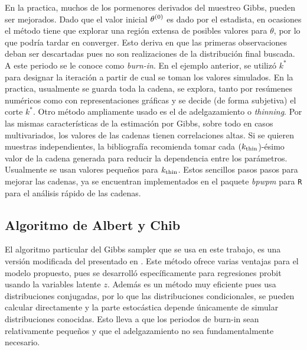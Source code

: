 \documentclass[../Main/Main.tex]{subfiles}
\begin{document}
En la practica, muchos de los pormenores derivados del muestreo Gibbs, pueden ser mejorados. Dado que el valor inicial $\theta^{(0)}$ es dado por el estadista, en ocasiones el método tiene que explorar una región extensa de posibles valores para $\theta$, por lo que podría tardar en converger. Esto deriva en que las primeras observaciones deban ser descartadas pues no son realizaciones de la distribución final buscada. A este periodo se le conoce como \textit{burn-in}. En el ejemplo anterior, se utilizó $k^*$ para designar la iteración a partir de cual se toman los valores simulados. En la practica, usualmente se guarda toda la cadena, se explora, tanto por resúmenes numéricos como con representaciones gráficas y se decide (de forma subjetiva) el corte  $k^*$. Otro método ampliamente usado es el de adelgazamiento o \textit{thinning}. Por las mismas características de la estimación por Gibbs, sobre todo en casos multivariados, los valores de las cadenas tienen correlaciones altas. Si se quieren muestras independientes, la bibliografía recomienda tomar cada $(k_{\text{thin}}$)-ésimo valor de la cadena generada para reducir la dependencia entre los parámetros. Usualmente se usan valores pequeños para $k_{\text{thin}}$.  Estos sencillos pasos pasos para mejorar las cadenas, ya se encuentran implementados en el paquete \textit{bpwpm} para \verb|R| para el análisis rápido de las cadenas.

\subsection{Algoritmo de Albert y Chib} \label{sec:AlbertChib}
El algoritmo particular del Gibbs sampler que se usa en este trabajo, es una versión modificada del presentado en \citet{albert1993bayesian}. Este método ofrece varias ventajas para el modelo propuesto, pues se desarrolló específicamente para regresiones probit usando la variables latente $z$. Además es un método muy eficiente pues usa distribuciones conjugadas, por lo que las distribuciones condicionales, se pueden calcular directamente y la parte estocástica depende únicamente de simular distribuciones conocidas. Esto lleva a que los periodos de burn-in sean relativamente pequeños y que el adelgazamiento no sea fundamentalmente necesario.
\end{document}
